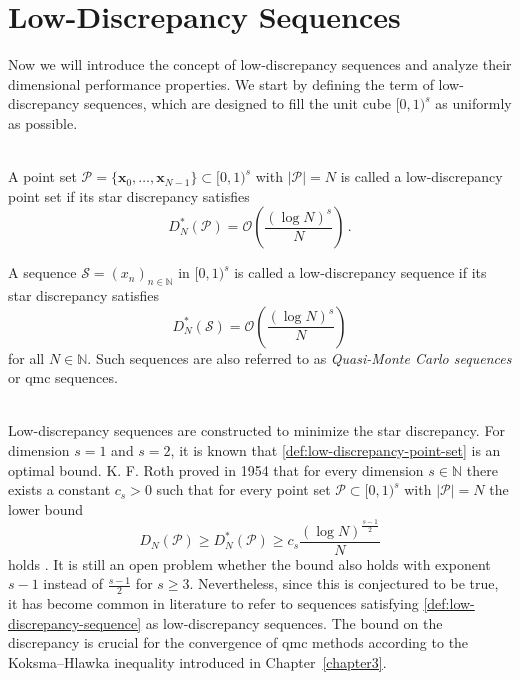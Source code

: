 \section{Low-Discrepancy Sequences}
Now we will introduce the concept of low-discrepancy sequences and analyze their
dimensional performance properties. We start by defining the term of
low-discrepancy sequences, which are designed to fill the unit cube $[0,1)^s$ as
uniformly as possible.

\begin{definition} \ \\
A point set $\mathcal{P} = \{\boldsymbol{x}_0, \dots, \boldsymbol{x}_{N-1}\} \subset
[0,1)^s$ with $|\mathcal{P}| = N$ is called a low-discrepancy point set if its star
discrepancy satisfies
\begin{equation}
\label{def:low-discrepancy-point-set}
    D_N^*(\mathcal{P}) = \mathcal{O}\left( \frac{(\log N)^s}{N} \right)\,.
\end{equation}

A sequence $\mathcal{S} = (x_n)_{n\in \mathbb{N}}$ in $[0,1)^s$ is called a
low-discrepancy sequence if its star discrepancy satisfies
\begin{equation}
\label{def:low-discrepancy-sequence}
    D_N^*(\mathcal{S}) = \mathcal{O}\left( \frac{(\log N)^s}{N} \right)
\end{equation}
for all $N \in \mathbb{N}$. Such sequences are also referred to as
\emph{Quasi-Monte Carlo sequences} or \ac{qmc} sequences.
\end{definition}

\begin{remark} \ \\
Low-discrepancy sequences are constructed to minimize the star discrepancy. For
dimension $s=1$ and $s=2$, it is known that
\eqref{def:low-discrepancy-point-set} is an optimal bound. K. F. Roth proved in
1954 that for every dimension $s \in \mathbb{N}$ there exists a constant $c_s >
0$ such that for every point set $\mathcal{P} \subset [0,1)^s$ with
$|\mathcal{P}| = N$ the lower bound 
\begin{equation*}
    D_N(\mathcal{P}) \geq D_N^*(\mathcal{P}) \geq c_s \frac{(\log N)^{\frac{s-1}{2}}}{N}
\end{equation*}
holds \cite[Theorem 2.24]{leobacher2014introduction}. It is still an open
problem whether the bound also holds with exponent $s-1$ instead of
$\frac{s-1}{2}$ for $s \geq 3$. Nevertheless, since this is conjectured to be
true, it has become common in literature to refer to sequences satisfying
\eqref{def:low-discrepancy-sequence} as low-discrepancy sequences. The bound on
the discrepancy is crucial for the convergence of \ac{qmc} methods according to
the Koksma--Hlawka inequality introduced in Chapter~\ref{chapter3}.
\end{remark}

